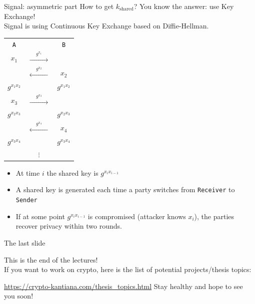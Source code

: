 \documentclass[usenames,dvipsnames, 9pt]{beamer}
\begin{document}
\begin{frame}{Signal: asymmetric part}
	\large How to get $k_{\text{shared}} $? \pause You know the answer: use Key Exchange! \\[5pt]
	Signal is using {\color{Orange} Continuous Key Exchange} based on Diffie-Hellman.
	\pause 
	\begin{center}
		\begin{tabular}{c c c }
			{\LARGE \color{Orange}\texttt{A}}&    & {\LARGE \color{Orange}\texttt{B}}  \\[5pt]
			$x_1 $& $\xrightarrow{\hspace{15pt} g^{x_1} \hspace{15pt}}$ & \\
			& $\xleftarrow{\hspace{15pt} g^{x_2} \hspace{15pt}}$ & $x_2$ \\
			{\color{Orange}$g^{x_1x_2}$} & & {\color{Orange}$g^{x_1x_2}$} \pause \\[10pt]
			$x_3 $& $\xrightarrow{\hspace{15pt} g^{x_3} \hspace{15pt}}$ & \\
			{\color{Orange}$g^{x_2x_3}$} & & {\color{Orange}$g^{x_2x_3}$ }\\[10pt]
			& $\xleftarrow{\hspace{15pt} g^{x_4} \hspace{15pt}}$ & $x_4$  \\
			{\color{Orange}$g^{x_3x_4}$} & & {\color{Orange}$g^{x_3x_4}$ }\\
			& $\vdots $& \\
		\end{tabular}
	\end{center}

\normalfont
\begin{itemize}
	\item At time $i$ the shared key is $g^{x_i x_{i-1}}$
	\item A shared key is generated each time a party switches from  {\color{Orange}\texttt{Receiver}} to {\color{Orange}\texttt{Sender}} 
	\item If at some point $g^{x_i x_{i-1}}$ is compromised (attacker knows $x_i$), the parties recover privacy within two rounds.
\end{itemize}
	
\end{frame}

\begin{frame}{The last slide}

	\centering
	This is the end of the lectures! \\[10pt]
	
	If you want to work on crypto, here is the list of potential projects/thesis topics:
	
	\url{https://crypto-kantiana.com/thesis_topics.html}
	\vfill
	\pause 
	Stay healthy and hope to see you soon!
\end{frame}
\end{document}
